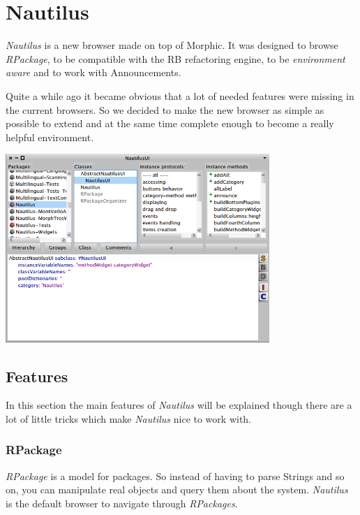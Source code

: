 \documentclass[a4paper,10pt,twoside]{book}
\newcommand\nautilus{\emph{Nautilus}\xspace}
\begin{document}
	
\fi
\sloppy


\chapter{Nautilus}


\nautilus is a new browser made on top of Morphic. It was designed to browse \emph{RPackage}, to be compatible with the RB refactoring engine, to be \emph{environment aware} and to work with Announcements.

Quite a while ago it became obvious that a lot of needed features were missing in the current browsers. So we decided to make the new browser as simple as possible to extend and at the same time complete enough to become a really helpful environment.

\begin{center}
	\includegraphics[width=10cm]{figures/nautilus1}
	\label{fig:nautilus1}
\end{center}


\section{Features}

In this section the main features of \nautilus will be explained  though there are a lot of little tricks which make \nautilus nice to work with.

\subsection*{RPackage}

\emph{RPackage} is a  model for packages. So instead of having to parse Strings and so on, you can manipulate real objects and query them about the system. \nautilus is the default browser to navigate through \emph{RPackages}.
\end{document}
